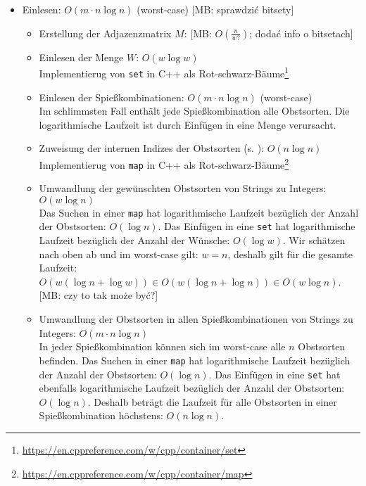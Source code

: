 \documentclass[a4paper,10pt,ngerman]{scrartcl}
\newcommand{\TODO}[1]{\todo[inline]{TODO: #1}}
\newcommand{\mb}[1]{{\color{red}[MB: #1]}}
\newcommand{\ttt}[1]{\texttt{#1}}
\begin{document}
\begin{itemize}
  \item Einlesen: $O(m \cdot n \log n)$ (worst-case) \mb{sprawdzić bitsety}
  \TODO{dodać złożoności dla $w$}
  \begin{itemize}
    \item Erstellung der Adjazenzmatrix $M$: \mb{$O(\frac{n}{w?})$; dodać info o bitsetach}
    \item Einlesen der Menge $W$: $O(w \log w)$\\
     Implementierug von \ttt{set} in C++ als Rot-schwarz-Bäume\footnote{\href{https://en.cppreference.com/w/cpp/container/set}{https://en.cppreference.com/w/cpp/container/set}}
    \item Einlesen der Spießkombinationen: $O(m \cdot n \log n)$ (worst-case)\\
    Im schlimmsten Fall enthält jede Spießkombination alle Obstsorten.
    Die logarithmische Laufzeit ist durch Einfügen in eine Menge verursacht.
    \item Zuweisung der internen Indizes der Obstsorten (s. ): $O(n \log n)$\\
     Implementierug von \ttt{map} in C++ als Rot-schwarz-Bäume\footnote{\href{https://en.cppreference.com/w/cpp/container/map}{https://en.cppreference.com/w/cpp/container/map}}    
    \item Umwandlung der gewünschten Obstsorten von Strings zu Integers: $O(w \log n)$\\
    Das Suchen in einer \ttt{map} hat logarithmische Laufzeit bezüglich der Anzahl
    der Obstsorten: $O(\log n)$.
    Das Einfügen in eine \ttt{set} hat logarithmische Laufzeit bezüglich der Anzahl
    der Wünsche: $O(\log w)$. Wir schätzen nach oben ab und im worst-case gilt: $w = n$,
    deshalb gilt für die gesamte Laufzeit: $O(w (\log n + \log w)) \in O(w (\log n + \log n)) \in 
    O(w \log n)$. \mb{czy to tak może być?}
    \item Umwandlung der Obstsorten in allen Spießkombinationen von Strings zu Integers:
    $O(m \cdot n \log n)$\\
    In jeder Spießkombination können sich im worst-case alle $n$ Obstsorten befinden.
    Das Suchen in einer \ttt{map} hat logarithmische Laufzeit bezüglich der Anzahl
    der Obstsorten: $O(\log n)$.
    Das Einfügen in eine \ttt{set} hat ebenfalls logarithmische Laufzeit bezüglich der Anzahl
    der Obstsorten: $O(\log n)$. 
    Deshalb beträgt die Laufzeit für alle Obstsorten in einer Spießkombination höchstens: $O(n \log n)$.   

\end{itemize}
\end{itemize}
\end{document}
